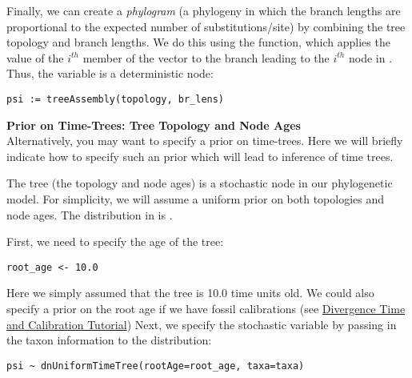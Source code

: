 Finally, we can create a \emph{phylogram} (a phylogeny in which the branch lengths are proportional to the expected number of substitutions/site) by combining the tree topology and branch lengths.
We do this using the  function, which applies the value of the $i^{th}$ member of the  vector to the branch leading to the $i^{th}$ node in . 
Thus, the  variable is a deterministic node: 

{\tt \begin{snugshade*}
\begin{lstlisting}
psi := treeAssembly(topology, br_lens)
\end{lstlisting}
\end{snugshade*}}

\begin{framed}
\textbf{Prior on Time-Trees: Tree Topology and Node Ages}\\
Alternatively, you may want to specify a prior on time-trees.
Here we will briefly indicate how to specify such an prior which will lead to inference of time trees.

The tree (the topology and node ages) is a stochastic node in our phylogenetic model. 
For simplicity, we will assume a uniform prior on both topologies and node ages.
The distribution in \RevBayes is . 


First, we need to specify the age of the tree:
{\tt \begin{snugshade*}
\begin{lstlisting}
root_age <- 10.0
\end{lstlisting}
\end{snugshade*}}
Here we simply assumed that the tree is 10.0 time units old. 
We could also specify a prior on the root age if we have fossil calibrations (see \href{https://github.com/revbayes/revbayes_tutorial/raw/master/tutorial_TeX/RB_DivergenceTime_Calibration_Tutorial/RB_DivergenceTime_Calibration_Tutorial.pdf}{Divergence Time and Calibration Tutorial})
Next, we specify the  stochastic variable by passing in the taxon information  to the  distribution:
{\tt \begin{snugshade*}
\begin{lstlisting}
psi ~ dnUniformTimeTree(rootAge=root_age, taxa=taxa)
\end{lstlisting}
\end{snugshade*}}


\end{framed}
